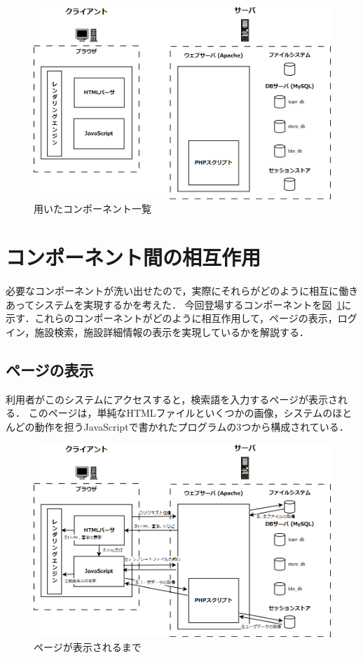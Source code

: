 \documentclass[a4paper]{jsarticle}
\begin{document}
\begin{figure}[htbp]
  \centering
  \includegraphics[width=0.8\linewidth]{../../image/story/base}
  \caption{用いたコンポーネント一覧}
  \label{fig:component}
\end{figure}


\section{コンポーネント間の相互作用}

必要なコンポーネントが洗い出せたので，実際にそれらがどのように相互に働きあってシステムを実現するかを考えた．
今回登場するコンポーネントを図~\ref{fig:component}に示す．これらのコンポーネントがどのように相互作用して，ページの表示，ログイン，施設検索，施設詳細情報の表示を実現しているかを解説する．

\subsection{ページの表示}
利用者がこのシステムにアクセスすると，検索語を入力するページが表示される．
このページは，単純なHTMLファイルといくつかの画像，システムのほとんどの動作を担うJavaScriptで書かれたプログラムの3つから構成されている．

\begin{figure}[htbp]
  \centering
  \includegraphics[width=0.8\linewidth]{../../image/story/1_show_page}
  \caption{ページが表示されるまで}
  \label{fig:show_page}
\end{figure}
\end{document}
